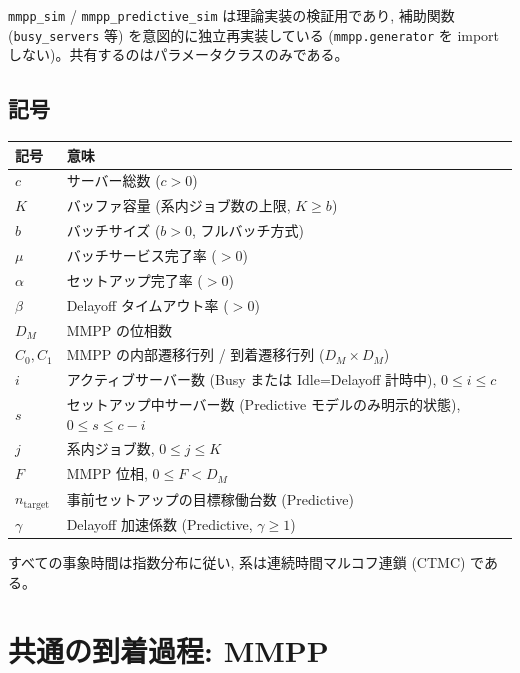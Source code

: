 \documentclass[a4paper,11pt]{article}
\newcommand{\code}[1]{\texttt{#1}}
\begin{document}
\code{mmpp\_sim} / \code{mmpp\_predictive\_sim} は理論実装の検証用であり,
補助関数 (\code{busy\_servers} 等) を意図的に独立再実装している
(\code{mmpp.generator} を import しない)。共有するのはパラメータクラスのみである。

\subsection{記号}

\begin{center}
\begin{tabular}{ll}
\toprule
記号 & 意味 \\
\midrule
$c$      & サーバー総数 ($c>0$) \\
$K$      & バッファ容量 (系内ジョブ数の上限, $K \ge b$) \\
$b$      & バッチサイズ ($b>0$, フルバッチ方式) \\
$\mu$    & バッチサービス完了率 ($>0$) \\
$\alpha$ & セットアップ完了率 ($>0$) \\
$\beta$  & Delayoff タイムアウト率 ($>0$) \\
$D_M$    & MMPP の位相数 \\
$C_0,C_1$& MMPP の内部遷移行列 / 到着遷移行列 ($D_M\times D_M$) \\
$i$      & アクティブサーバー数 (Busy または Idle=Delayoff 計時中), $0\le i\le c$ \\
$s$      & セットアップ中サーバー数 (Predictive モデルのみ明示的状態), $0\le s\le c-i$ \\
$j$      & 系内ジョブ数, $0\le j\le K$ \\
$F$      & MMPP 位相, $0\le F<D_M$ \\
$n_{\mathrm{target}}$ & 事前セットアップの目標稼働台数 (Predictive) \\
$\gamma$ & Delayoff 加速係数 (Predictive, $\gamma\ge1$) \\
\bottomrule
\end{tabular}
\end{center}

すべての事象時間は指数分布に従い, 系は連続時間マルコフ連鎖 (CTMC) である。

\section{共通の到着過程: MMPP}
\end{document}
